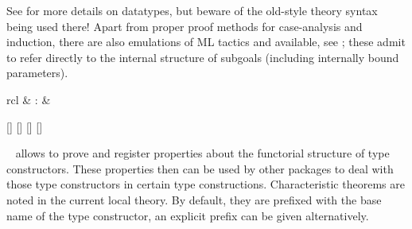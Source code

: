 \begin{isabellebody}
\begin{isamarkuptext}
  See \cite{isabelle-HOL} for more details on datatypes, but beware of
  the old-style theory syntax being used there!  Apart from proper
  proof methods for case-analysis and induction, there are also
  emulations of ML tactics \hyperlink{method.HOL.case-tac}{\mbox{}} and \hyperlink{method.HOL.induct-tac}{\mbox{}} available, see ; these admit
  to refer directly to the internal structure of subgoals (including
  internally bound parameters).%
\end{isamarkuptext}%
\isamarkuptrue%
%
\isamarkuptrue%
%
\begin{isamarkuptext}%
\begin{matharray}{rcl}
    \hypertarget{command.HOL.enriched-type}{\hyperlink{command.HOL.enriched-type}{\mbox{}}} & : & 
  \end{matharray}

  \begin{railoutput}
[]
\rail@bar
{}
[]
[]
\rail@endbar
{}[]
\rail@end
\end{railoutput}


  \begin{description}

  \item \hyperlink{command.HOL.enriched-type}{\mbox{}}~ allows to
  prove and register properties about the functorial structure of type
  constructors.  These properties then can be used by other packages
  to deal with those type constructors in certain type constructions.
  Characteristic theorems are noted in the current local theory.  By
  default, they are prefixed with the base name of the type
  constructor, an explicit prefix can be given alternatively.


\end{description}
\end{isamarkuptext}
\end{isabellebody}
